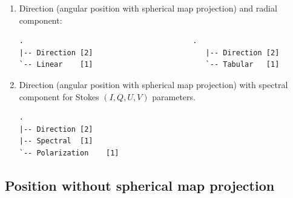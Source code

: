 \documentclass[a4paper,10pt,bibtotoc]{scrreprt}
\begin{document}

\begin{enumerate}
\item Direction (angular position with spherical map projection) and
  radial component:
\begin{lstlisting}
.                                       .
|-- Direction [2]                          |-- Direction [2]
`-- Linear    [1]                          `-- Tabular   [1]
\end{lstlisting}
\item Direction (angular position with spherical map projection) with spectral
  component for Stokes $(I,Q,U,V)$ parameters.
\begin{lstlisting}
.
|-- Direction [2]
|-- Spectral  [1]
`-- Polarization    [1]
\end{lstlisting}
\end{enumerate}

\subsection*{Position without spherical map projection}
\end{document}
